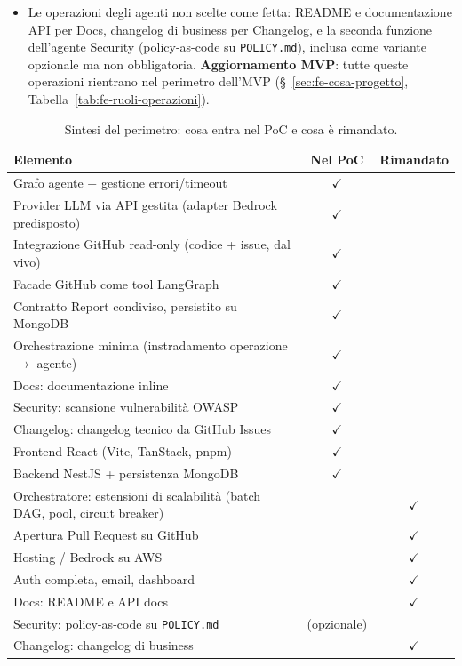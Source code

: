 \documentclass[11pt,a4paper]{article}
\begin{document}
\begin{itemize}
    \item Le operazioni degli agenti non scelte come fetta: README e documentazione API per Docs, changelog di business per Changelog, e la seconda funzione dell'agente Security (policy-as-code su \texttt{POLICY.md}), inclusa come variante opzionale ma non obbligatoria. \textbf{Aggiornamento MVP}: tutte queste operazioni rientrano nel perimetro dell'MVP (\S~\ref{sec:fe-cosa-progetto}, Tabella~\ref{tab:fe-ruoli-operazioni}).
\end{itemize}

\begin{table}[H]
\centering
\caption{Sintesi del perimetro: cosa entra nel PoC e cosa è rimandato.}
\label{tab:perimetro}
\vspace{2mm}
\renewcommand{\arraystretch}{1.2}
\begin{tabularx}{\textwidth}{|X|c|c|}
\hline
\textbf{Elemento} & \textbf{Nel PoC} & \textbf{Rimandato} \\ \hline
Grafo agente + gestione errori/timeout & $\checkmark$ & \\ \hline
Provider LLM via API gestita (adapter Bedrock predisposto) & $\checkmark$ & \\ \hline
Integrazione GitHub read-only (codice + issue, dal vivo) & $\checkmark$ & \\ \hline
Facade GitHub come tool LangGraph & $\checkmark$ & \\ \hline
Contratto Report condiviso, persistito su MongoDB & $\checkmark$ & \\ \hline
Orchestrazione minima (instradamento operazione $\to$ agente) & $\checkmark$ & \\ \hline
Docs: documentazione inline & $\checkmark$ & \\ \hline
Security: scansione vulnerabilità OWASP & $\checkmark$ & \\ \hline
Changelog: changelog tecnico da GitHub Issues & $\checkmark$ & \\ \hline
Frontend React (Vite, TanStack, pnpm) & $\checkmark$ & \\ \hline
Backend NestJS + persistenza MongoDB & $\checkmark$ & \\ \hline
Orchestratore: estensioni di scalabilità (batch DAG, pool, circuit breaker) & & $\checkmark$ \\ \hline
Apertura Pull Request su GitHub & & $\checkmark$ \\ \hline
Hosting / Bedrock su AWS & & $\checkmark$ \\ \hline
Auth completa, email, dashboard & & $\checkmark$ \\ \hline
Docs: README e API docs & & $\checkmark$ \\ \hline
Security: policy-as-code su \texttt{POLICY.md} & (opzionale) & \\ \hline
Changelog: changelog di business & & $\checkmark$ \\ \hline
\end{tabularx}
\end{table}
\end{document}
